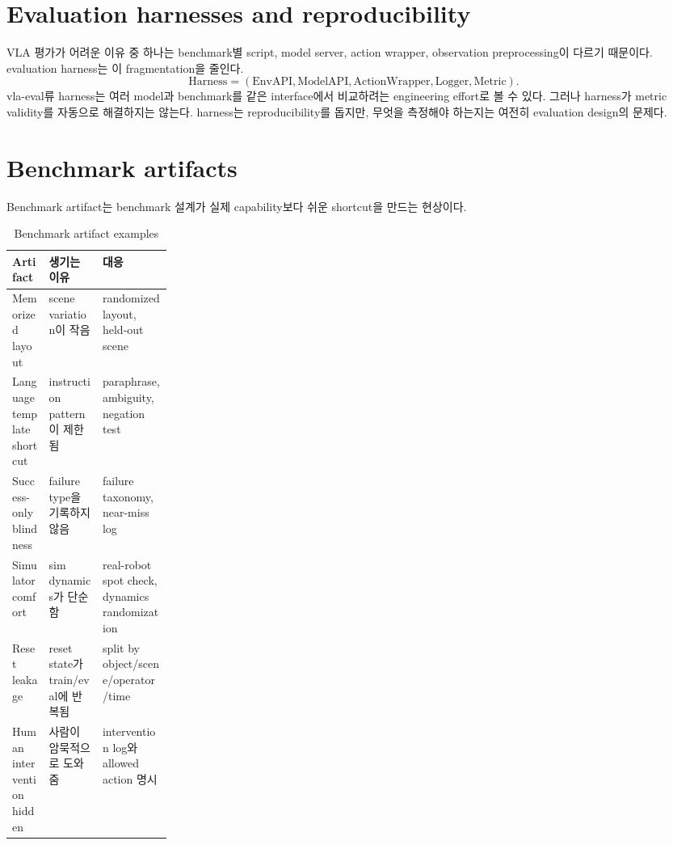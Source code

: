 \section{Evaluation harnesses and reproducibility}

VLA 평가가 어려운 이유 중 하나는 benchmark별 script, model server, action wrapper, observation preprocessing이 다르기 때문이다. evaluation harness는 이 fragmentation을 줄인다.
\begin{equation}
  \mathrm{Harness}
  =
  (
  \mathrm{EnvAPI},
  \mathrm{ModelAPI},
  \mathrm{ActionWrapper},
  \mathrm{Logger},
  \mathrm{Metric}
  ).
  \label{eq:ch16-harness}
\end{equation}
vla-eval류 harness는 여러 model과 benchmark를 같은 interface에서 비교하려는 engineering effort로 볼 수 있다. 그러나 harness가 metric validity를 자동으로 해결하지는 않는다. harness는 reproducibility를 돕지만, 무엇을 측정해야 하는지는 여전히 evaluation design의 문제다.

\section{Benchmark artifacts}

Benchmark artifact는 benchmark 설계가 실제 capability보다 쉬운 shortcut을 만드는 현상이다.
\begin{table}[h]
  \centering
  \caption{Benchmark artifact examples}
  \begin{tabularx}{\linewidth}{p{0.23\linewidth}X X}
    \toprule
    Artifact & 생기는 이유 & 대응 \\
    \midrule
    Memorized layout & scene variation이 작음 & randomized layout, held-out scene \\
    Language template shortcut & instruction pattern이 제한됨 & paraphrase, ambiguity, negation test \\
    Success-only blindness & failure type을 기록하지 않음 & failure taxonomy, near-miss log \\
    Simulator comfort & sim dynamics가 단순함 & real-robot spot check, dynamics randomization \\
    Reset leakage & reset state가 train/eval에 반복됨 & split by object/scene/operator/time \\
    Human intervention hidden & 사람이 암묵적으로 도와줌 & intervention log와 allowed action 명시 \\
    \bottomrule
  \end{tabularx}
  \label{tab:ch16-artifacts}
\end{table}

